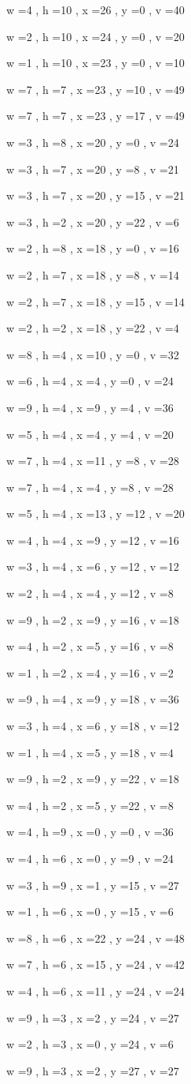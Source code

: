 \documentclass[11pt]{article}
\begin{document}
w =4 , h =10 , x =26 , y =0 , v =40
\par
w =2 , h =10 , x =24 , y =0 , v =20
\par
w =1 , h =10 , x =23 , y =0 , v =10
\par
w =7 , h =7 , x =23 , y =10 , v =49
\par
w =7 , h =7 , x =23 , y =17 , v =49
\par
w =3 , h =8 , x =20 , y =0 , v =24
\par
w =3 , h =7 , x =20 , y =8 , v =21
\par
w =3 , h =7 , x =20 , y =15 , v =21
\par
w =3 , h =2 , x =20 , y =22 , v =6
\par
w =2 , h =8 , x =18 , y =0 , v =16
\par
w =2 , h =7 , x =18 , y =8 , v =14
\par
w =2 , h =7 , x =18 , y =15 , v =14
\par
w =2 , h =2 , x =18 , y =22 , v =4
\par
w =8 , h =4 , x =10 , y =0 , v =32
\par
w =6 , h =4 , x =4 , y =0 , v =24
\par
w =9 , h =4 , x =9 , y =4 , v =36
\par
w =5 , h =4 , x =4 , y =4 , v =20
\par
w =7 , h =4 , x =11 , y =8 , v =28
\par
w =7 , h =4 , x =4 , y =8 , v =28
\par
w =5 , h =4 , x =13 , y =12 , v =20
\par
w =4 , h =4 , x =9 , y =12 , v =16
\par
w =3 , h =4 , x =6 , y =12 , v =12
\par
w =2 , h =4 , x =4 , y =12 , v =8
\par
w =9 , h =2 , x =9 , y =16 , v =18
\par
w =4 , h =2 , x =5 , y =16 , v =8
\par
w =1 , h =2 , x =4 , y =16 , v =2
\par
w =9 , h =4 , x =9 , y =18 , v =36
\par
w =3 , h =4 , x =6 , y =18 , v =12
\par
w =1 , h =4 , x =5 , y =18 , v =4
\par
w =9 , h =2 , x =9 , y =22 , v =18
\par
w =4 , h =2 , x =5 , y =22 , v =8
\par
w =4 , h =9 , x =0 , y =0 , v =36
\par
w =4 , h =6 , x =0 , y =9 , v =24
\par
w =3 , h =9 , x =1 , y =15 , v =27
\par
w =1 , h =6 , x =0 , y =15 , v =6
\par
w =8 , h =6 , x =22 , y =24 , v =48
\par
w =7 , h =6 , x =15 , y =24 , v =42
\par
w =4 , h =6 , x =11 , y =24 , v =24
\par
w =9 , h =3 , x =2 , y =24 , v =27
\par
w =2 , h =3 , x =0 , y =24 , v =6
\par
w =9 , h =3 , x =2 , y =27 , v =27
\par
\newpage
\end{document}
